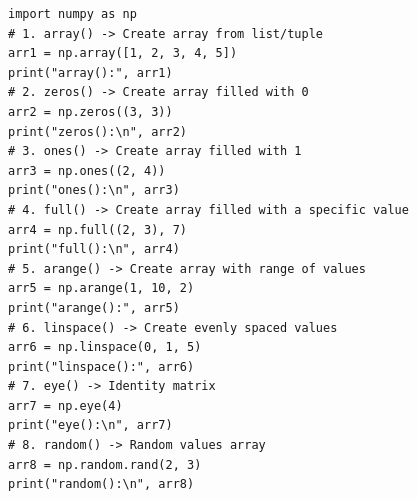 \begin{verbatim}
import numpy as np
# 1. array() -> Create array from list/tuple
arr1 = np.array([1, 2, 3, 4, 5])
print("array():", arr1)
# 2. zeros() -> Create array filled with 0
arr2 = np.zeros((3, 3))
print("zeros():\n", arr2)
# 3. ones() -> Create array filled with 1
arr3 = np.ones((2, 4))
print("ones():\n", arr3)
# 4. full() -> Create array filled with a specific value
arr4 = np.full((2, 3), 7)
print("full():\n", arr4)
# 5. arange() -> Create array with range of values
arr5 = np.arange(1, 10, 2)
print("arange():", arr5)
# 6. linspace() -> Create evenly spaced values
arr6 = np.linspace(0, 1, 5)
print("linspace():", arr6)
# 7. eye() -> Identity matrix
arr7 = np.eye(4)
print("eye():\n", arr7)
# 8. random() -> Random values array
arr8 = np.random.rand(2, 3)
print("random():\n", arr8)
\end{verbatim}